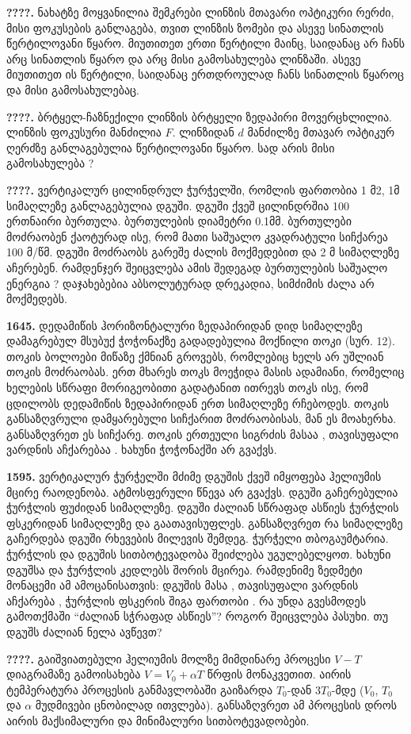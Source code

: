 \documentclass[12pt,a4paper,]{report}
\begin{document}
\textbf{????.} ნახატზე მოყვანილია შემკრები ლინზის მთავარი ოპტიკური რერძი, მისი ფოკუსების განლაგება, თვით ლინზის ზომები და ასევე სინათლის წერტილოვანი წყარო. მიუთითეთ ერთი წერტილი მაინც, საიდანაც არ ჩანს არც სინათლის წყარო და არც მისი გამოსახულება ლინზაში. ასევე მიუთითეთ ის წერტილი, საიდანაც ერთდროულად ჩანს სინათლის წყაროც და მისი გამოსახულებაც.

\textbf{????.} ბრტყელ-ჩაზნექილი ლინზის ბრტყელი ზედაპირი მოვერცხლილია. ლინზის ფოკუსური მანძილია $F$. ლინზიდან $d$ მანძილზე მთავარ ოპტიკურ ღერძზე განლაგებულია წერტილოვანი წყარო. სად არის მისი გამოსახულება ? 

\textbf{????.} ვერტიკალურ ცილინდრულ ჭურჭელში, რომლის ფართობია 1 მ2, 1მ სიმაღლეზე განლაგებულია დგუში. დგუში ქვეშ ცილინდრშია 100 ერთნაირი ბურთულა. ბურთულების დიამეტრი 0.1მმ. ბურთულები მოძრაობენ ქაოტურად ისე, რომ მათი საშუალო კვადრატული სიჩქარეა 100 მ/წმ. დგუში მოძრაობს გარეშე ძალის მოქმედებით და 2 მ სიმაღლეზე აჩერებენ. რამდენჯერ შეიცვლება ამის შედეგად ბურთულების საშუალო ენერგია ? დაჯახებებია აბსოლუტურად დრეკადია, სიმძიმის ძალა არ მოქმედებს. 

\textbf{1645.} დედამიწის ჰორიზონტალური ზედაპირიდან დიდ   სიმაღლეზე დამაგრებულ მსუბუქ ჭოჭონაქზე გადადებულია მოქნილი თოკი (სურ. 12). თოკის ბოლოები მიწაზე ქმნიან გროვებს, რომლებიც ხელს არ უშლიან თოკის მოძრაობას. ერთ მხარეს თოკს მოეჭიდა   მასის ადამიანი, რომელიც  ხელების სწრაფი მორიგეობითი  გადატანით ითრევს თოკს ისე, რომ ცდილობს დედამიწის ზედაპირიდან ერთ სიმაღლეზე რჩებოდეს. თოკის განსაზღვრული დამყარებული სიჩქარით მოძრაობისას, მან ეს მოახერხა. განსაზღვრეთ ეს სიჩქარე. თოკის ერთეული სიგრძის მასაა  , თავისუფალი ვარდნის აჩქარებაა  . ხახუნი ჭოჭონაქში არ გვაქვს.                                                                                                             
                                            
\textbf{1595.} ვერტიკალურ ჭურჭელში მძიმე დგუშის ქვეშ იმყოფება ჰელიუმის მცირე რაოდენობა. ატმოსფერული წნევა არ გვაქვს. დგუში გაჩერებულია ჭურჭლის ფუძიდან   სიმაღლეზე. დგუში ძალიან სწრაფად ასწიეს ჭურჭლის ფსკერიდან   სიმაღლეზე და გაათავისუფლეს. განსაზღვრეთ რა სიმაღლეზე გაჩერდება დგუში რხევების მილევის შემდეგ. ჭურჭელი თბოგაუმტარია. ჭურჭლის და დგუშის სითბოტევადობა შეიძლება უგულებელყოთ. ხახუნი დგუშსა და ჭურჭლის კედლებს შორის მცირეა. რამდენიმე ზედმეტი მონაცემი ამ ამოცანისათვის: დგუშის მასა  , თავისუფალი ვარდნის აჩქარება  , ჭურჭლის ფსკერის შიგა ფართობი  . რა უნდა გვესმოდეს გამოთქმაში “ძალიან სჭრაფად ასწიეს”? როგორ შეიცვლება პასუხი. თუ დგუშს ძალიან ნელა ავწევთ?

\textbf{????.} გაიშვიათებული ჰელიუმის მოლზე მიმდინარე პროცესი  $V-T$ დიაგრამაზე გამოისახება $V=V_0+\alpha T$ წრფის მონაკვეთით. აირის ტემპერატურა პროცესის განმავლობაში გაიზარდა $T_0$-დან $3T_0$-მდე  ($V_0$, $T_0$ და $\alpha$ მუდმივები ცნობილად ითვლება). განსაზღვრეთ ამ პროცესის დროს აირის მაქსიმალური და მინიმალური სითბოტევადობები.
\end{document}

